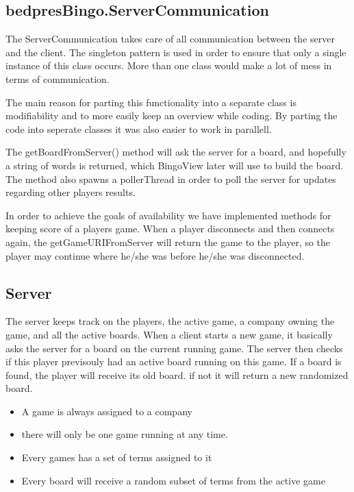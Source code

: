 \subsection{bedpresBingo.ServerCommunication}
The ServerCommunication takes care of all communication between the server and the client. The singleton pattern is used in order to ensure that only a single instance of this class occurs. More than one class would make a lot of mess in terms of communication. 

The main reason for parting this functionality into a separate class is modifiability and to more easily keep an overview while coding. By parting the code into seperate classes it was also easier to work in parallell. 

The getBoardFromServer() method will ask the server for a board, and hopefully a string of words is returned, which BingoView later will use to build the board. The method also spawns a pollerThread in order to poll the server for updates regarding other players results.

In order to achieve the goals of availability we have implemented methods for keeping score of a players game. When a player disconnects and then connects again, the getGameURIFromServer will return the game to the player, so the player may continue where he/she was before he/she was disconnected.


\subsection{Server}
The server keeps track on the players, the active game, a company owning the game, and all the active boards. When a client starts a new game, it basically asks the server for a board on the current running game. The server then checks if this player previsouly had an active board running on this game. If a board is found, the player will receive its old board. if not it will return a new randomized board.

\begin{itemize}
	\item A game is always assigned to a company
	\item there will only be one game running at any time. 
	\item Every games has a set of terms assigned to it
	\item Every board will receive a random subset of terms from the active game
\end{itemize}

